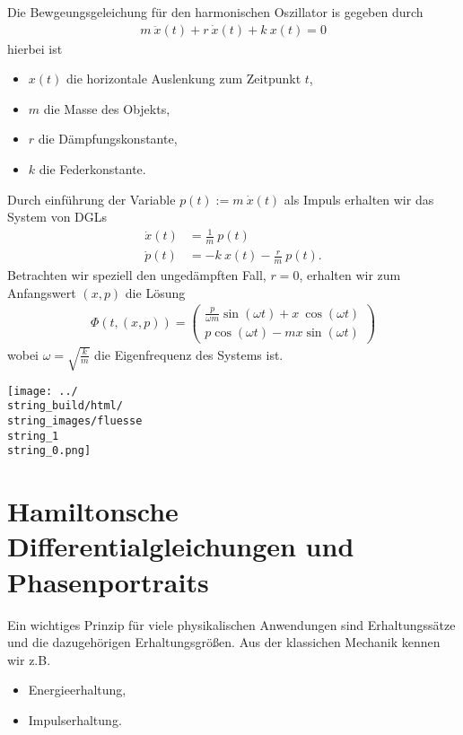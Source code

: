 \documentclass[letterpaper,10pt,english]{jupyterBook}
\begin{document}
\begin{example}{}{}



Die Bewgeungsgeleichung für den harmonischen Oszillator is gegeben durch
\begin{align*}
m~\ddot{x}(t) + r~\dot{x}(t) + k~x(t)=0
\end{align*}
hierbei ist
\begin{itemize}
\item {} 
\(x(t)\) die horizontale Auslenkung zum Zeitpunkt \(t\),

\item {} 
\(m\) die Masse des Objekts,

\item {} 
\(r\) die Dämpfungskonstante,

\item {} 
\(k\) die Federkonstante.

\end{itemize}

Durch einführung der Variable \(p(t):= m~\dot{x}(t)\) als Impuls erhalten wir das System von DGLs
\begin{align*}
\dot{x}(t) &= \frac{1}{m}~p(t) \\
\dot{p}(t) &= -k~x(t) - \frac{r}{m}~p(t).
\end{align*}
Betrachten wir speziell den ungedämpften Fall, \(r=0\), erhalten wir zum Anfangswert \((x,p)\) die Lösung
\begin{align*}
\Phi(t, (x,p)) = 
\begin{pmatrix}
\frac{p}{\omega m}\sin(\omega t) + x~\cos(\omega t)\\
p \cos(\omega t) - m x \sin(\omega t)
\end{pmatrix}
\end{align*}
wobei \(\omega=\sqrt{\frac{k}{m}}\) die Eigenfrequenz des Systems ist.
\end{example}

\noindent\texttt{[image: ../\\string\_build/html/\\string\_images/fluesse\\string\_1\\string\_0.png]}


\section{Hamiltonsche Differentialgleichungen und Phasenportraits}
\label{\detokenize{ode/hamilton:hamiltonsche-differentialgleichungen-und-phasenportraits}}\label{\detokenize{ode/hamilton::doc}}
Ein wichtiges Prinzip für viele physikalischen Anwendungen sind Erhaltungssätze und die dazugehörigen Erhaltungsgrößen. Aus der klassichen Mechanik kennen wir z.B.
\begin{itemize}
\item {} 
Energieerhaltung,

\item {} 
Impulserhaltung.

\end{itemize}
\end{document}
